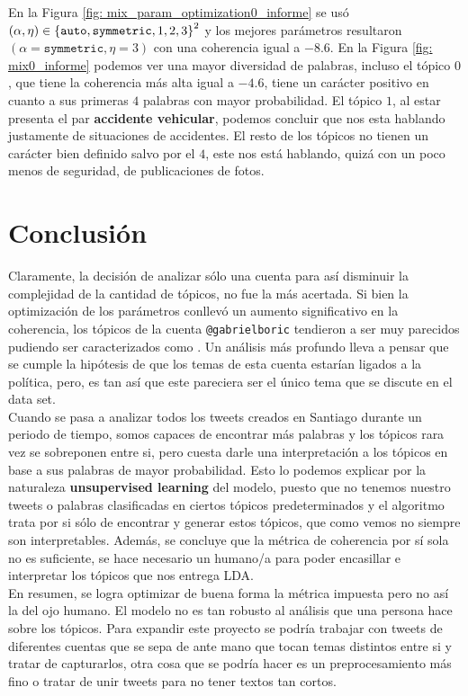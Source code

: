 \documentclass{article}
\begin{document}
	En la Figura \ref{fig: mix_param_optimization0_informe} se usó $(\alpha,\eta)\in\left\{\texttt{auto}, \texttt{symmetric}, 1, 2, 3\right\}^2$ y los mejores parámetros resultaron $(\alpha=\texttt{symmetric},\eta=3)$ con una coherencia igual a $-8.6$. En la Figura \ref{fig: mix0_informe} podemos ver una mayor diversidad de palabras, incluso el tópico $0$, que tiene la coherencia más alta igual a $-4.6$, tiene un carácter positivo en cuanto a sus primeras $4$ palabras con mayor probabilidad. El tópico $1$, al estar presenta el par \textbf{accidente vehicular}, podemos concluir que nos esta hablando justamente de situaciones de accidentes. El resto de los tópicos no tienen un carácter bien definido salvo por el $4$, este nos está hablando, quizá con un poco menos de seguridad, de publicaciones de fotos.  
	
	
\section{Conclusión}
	
	Claramente, la decisión de analizar sólo una cuenta para así disminuir la complejidad de la cantidad de tópicos, no fue la más acertada. Si bien la optimización de los parámetros conllevó un aumento significativo en la coherencia, los tópicos de la cuenta \texttt{@gabrielboric} tendieron a ser muy parecidos pudiendo ser caracterizados como . Un análisis más profundo lleva a pensar que se cumple la hipótesis de que los temas de esta cuenta estarían ligados a la política, pero, es tan así que este pareciera ser el único tema que se discute en el data set.\\
	
	Cuando se pasa a analizar todos los tweets creados en Santiago durante un periodo de tiempo, somos capaces de encontrar más palabras y los tópicos rara vez se sobreponen entre si, pero cuesta darle una interpretación a los tópicos en base a sus palabras de mayor probabilidad. Esto lo podemos explicar por la naturaleza \textbf{unsupervised learning} del modelo, puesto que no tenemos nuestro tweets o palabras clasificadas en ciertos tópicos predeterminados y el algoritmo trata por si sólo de encontrar y generar estos tópicos, que como vemos no siempre son interpretables. Además, se concluye que la métrica de coherencia por sí sola no es suficiente, se hace necesario un humano/a para poder encasillar e interpretar los tópicos que nos entrega LDA.\\
	
	En resumen, se logra optimizar de buena forma la métrica impuesta pero no así la del ojo humano. El modelo no es tan robusto al análisis que una persona hace sobre los tópicos. Para expandir este proyecto se podría trabajar con tweets de diferentes cuentas que se sepa de ante mano que tocan temas distintos entre si y tratar de capturarlos, otra cosa que se podría hacer es un preprocesamiento más fino o tratar de unir tweets para no tener textos tan cortos.
	   

\end{document}
